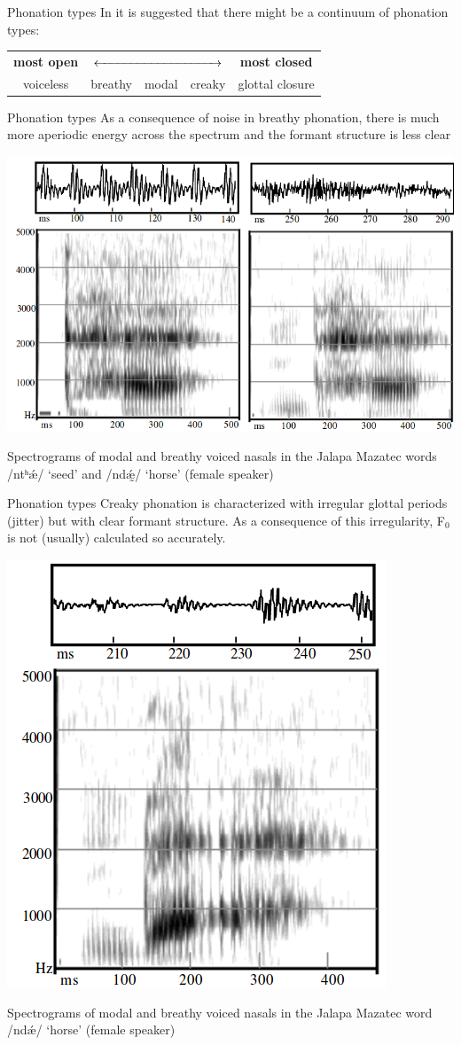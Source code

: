 \begin{frame}{Phonation types}
In \citep{ladefoged71} it is suggested that there might be a continuum of phonation types:\\
\begin{center}
\begin{tabular}{ccccc}
\textbf{most open} & \multicolumn{3}{c}{$\xleftrightarrow{\hspace*{3.5cm}}$}  & \textbf{most closed} \\
voiceless & breathy & modal & creaky & glottal closure \\ 
\end{tabular}
\end{center}
\end{frame}

\begin{frame}{Phonation types}
As a consequence of noise in breathy phonation, there is much more
aperiodic energy across the spectrum and the formant structure is less clear \citep{gordon01}
\begin{center}
\includegraphics[width=0.73\linewidth]{02-breathy.png}
\end{center}
Spectrograms of modal and breathy voiced nasals in the Jalapa Mazatec  words /ntʰǽ/ ‘seed’ and /ndǽ̰/ ‘horse’ (female speaker)\\
\end{frame}

\begin{frame}{Phonation types}
Creaky phonation is characterized with irregular glottal periods (jitter) but
with clear formant structure. As a consequence of this irregularity, F$_0$
is not (usually) calculated so accurately.
\begin{center}
\includegraphics[width=0.40\linewidth]{03-creaky.png}
\end{center}
Spectrograms of modal and breathy voiced nasals in the Jalapa Mazatec  word /ndǽ/ ‘horse’ (female speaker)\\
\end{frame}

